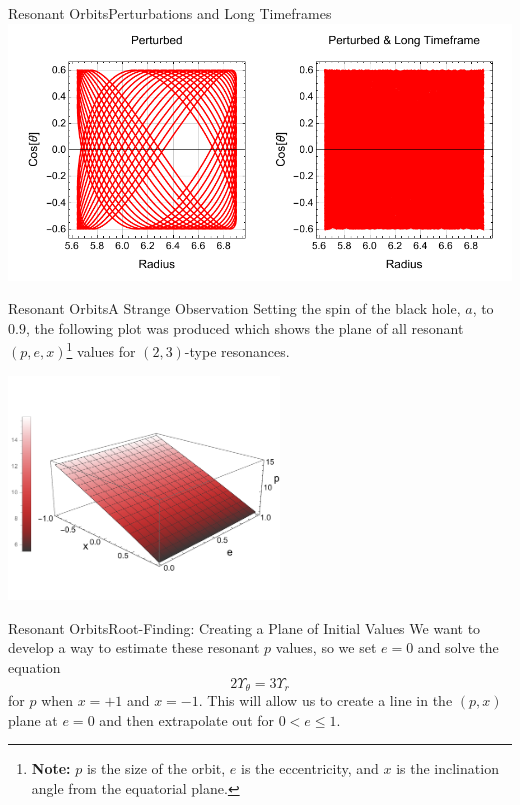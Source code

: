\documentclass[12pt]{beamer}
\begin{document}
\begin{frame}{Resonant Orbits}{Perturbations and Long Timeframes}
    \centering
    \includegraphics[width=\textwidth]{kerrRThResoLong.pdf}
\end{frame}

\begin{frame}{Resonant Orbits}{A Strange Observation}
Setting the spin of the black hole, $a$, to $0.9$, the following plot was produced which shows the plane of all resonant $(p,e,x)$\footnote{\textbf{Note:} $p$ is the size of the orbit, $e$ is the eccentricity, and $x$ is the inclination angle from the equatorial plane.} values for $(2,3)$-type resonances.

\centering
    \includegraphics[width=0.54\textwidth]{resoPEXPlane.pdf}
\end{frame}

\begin{frame}{Resonant Orbits}{Root-Finding: Creating a Plane of Initial Values}
We want to develop a way to estimate these resonant $p$ values, so we set $e=0$ and solve the equation
\begin{equation}
	2\Upsilon_\theta=3\Upsilon_r
\end{equation}
for $p$ when $x=+1$ and $x=-1$.
\vskip12pt
This will allow us to create a line in the $(p,x)$ plane at $e=0$ and then extrapolate out for $0<e\leq 1$.
\end{frame}
\end{document}
